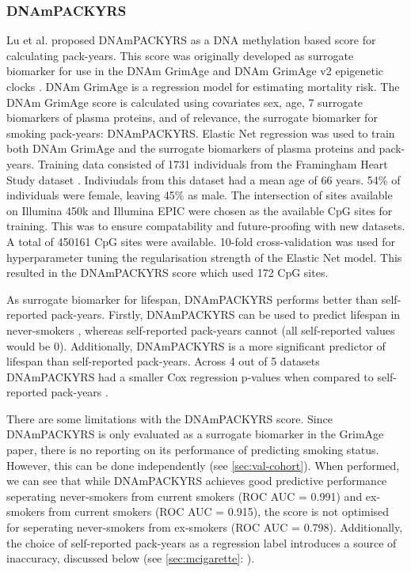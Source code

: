 \documentclass{article}
\begin{document}
\subsubsection{DNAmPACKYRS}
Lu et al. \cite{lu2019dna} proposed DNAmPACKYRS as a DNA methylation based score for calculating pack-years. This score was originally developed as surrogate biomarker for use in the DNAm GrimAge and DNAm GrimAge v2 epigenetic clocks \cite{lu2019dna,lu2022dna}. DNAm GrimAge is a regression model for estimating mortality risk. The DNAm GrimAge score is calculated using covariates sex, age, 7 surrogate biomarkers of plasma proteins, and of relevance, the surrogate biomarker for smoking pack-years: DNAmPACKYRS. Elastic Net regression was used to train both DNAm GrimAge and the surrogate biomarkers of plasma proteins and pack-years. Training data consisted of 1731 individuals from the Framingham Heart Study dataset \cite{doi:10.2105/AJPH.41.3.279}. Indiviudals from this dataset had a mean age of 66 years. 54\% of individuals were female, leaving 45\% as male. The intersection of sites available on Illumina 450k and Illumina EPIC were chosen as the available CpG sites for training. This was to ensure compatability and future-proofing with new datasets. A total of \num{450161} CpG sites were available. 10-fold cross-validation was used for hyperparameter tuning the regularisation strength of the Elastic Net model. This resulted in the DNAmPACKYRS score which used 172 CpG sites.

As surrogate biomarker for lifespan, DNAmPACKYRS performs better than self-reported pack-years. Firstly, DNAmPACKYRS can be used to predict lifespan in never-smokers \cite{lu2019dna}, whereas self-reported pack-years cannot (all self-reported values would be 0). Additionally, DNAmPACKYRS is a more significant predictor of lifespan than self-reported pack-years. Across 4 out of 5 datasets DNAmPACKYRS had a smaller Cox regression p-values when compared to self-reported pack-years \cite{lu2019dna}.

There are some limitations with the DNAmPACKYRS score. Since DNAmPACKYRS is only evaluated as a surrogate biomarker in the GrimAge paper, there is no reporting on its performance of predicting smoking status. However, this can be done independently (see \ref{sec:val-cohort}). When performed, we can see that while DNAmPACKYRS achieves good predictive performance seperating never-smokers from current smokers (ROC AUC = 0.991) and ex-smokers from current smokers (ROC AUC = 0.915), the score is not optimised for seperating never-smokers from ex-smokers (ROC AUC = 0.798). Additionally, the choice of self-reported pack-years as a regression label introduces a source of inaccuracy, discussed below (see \ref{sec:mcigarette}: ).
\end{document}
